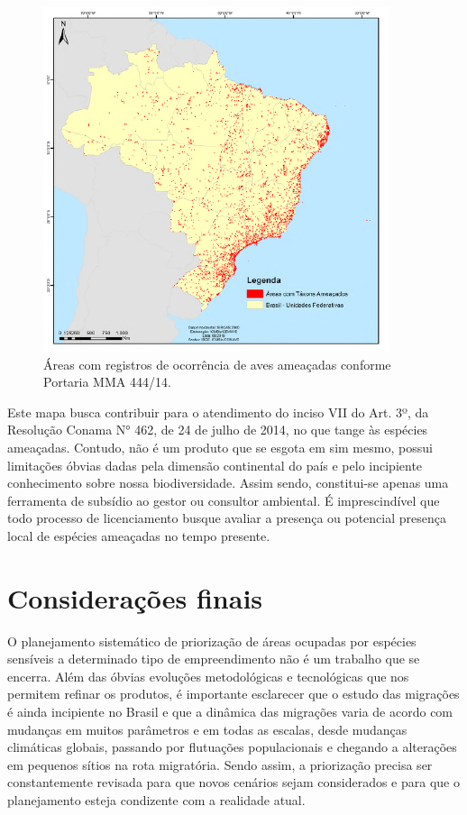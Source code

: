 \documentclass[
  oneside]{scrbook}
\begin{document}
\begin{figure}

{\centering \includegraphics[width=0.8\linewidth]{imagens/figura03} 

}

\caption{Áreas com registros de ocorrência de aves ameaçadas conforme Portaria MMA 444/14.}\label{fig:03}
\end{figure}

Este mapa busca contribuir para o atendimento do inciso VII do Art. 3º, da Resolução Conama N° 462, de 24 de julho de 2014, no que tange às espécies ameaçadas. Contudo, não é um produto que se esgota em sim mesmo, possui limitações óbvias dadas pela dimensão continental do país e pelo incipiente conhecimento sobre nossa biodiversidade. Assim sendo, constitui-se apenas uma ferramenta de subsídio ao gestor ou consultor ambiental. É imprescindível que todo processo de licenciamento busque avaliar a presença ou potencial presença local de espécies ameaçadas no tempo presente.

\hypertarget{cons-finais}{%
\section{Considerações finais}\label{cons-finais}}

O planejamento sistemático de priorização de áreas ocupadas por espécies sensíveis a determinado tipo de empreendimento não é um trabalho que se encerra. Além das óbvias evoluções metodológicas e tecnológicas que nos permitem refinar os produtos, é importante esclarecer que o estudo das migrações é ainda incipiente no Brasil e que a dinâmica das migrações varia de acordo com mudanças em muitos parâmetros e em todas as escalas, desde mudanças climáticas globais, passando por flutuações populacionais e chegando a alterações em pequenos sítios na rota migratória. Sendo assim, a priorização precisa ser constantemente revisada para que novos cenários sejam considerados e para que o planejamento esteja condizente com a realidade atual.
\end{document}
